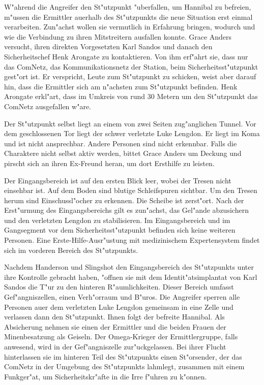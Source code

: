 
W"ahrend die Angreifer den St"utzpunkt "uberfallen, um Hannibal zu befreien, m"ussen die Ermittler au\3erhalb des St"utzpunkts die neue Situation erst einmal verarbeiten. Zun"achst wollen sie vermutlich in Erfahrung bringen, wodurch und wie die Verbindung zu ihren Mitstreitern ausfallen konnte. Grace Anders versucht, ihren direkten Vorgesetzten Karl Sandos und danach den Sicherheitschef Henk Arongate zu kontaktieren. Von ihm erf"ahrt sie, dass nur das ComNetz, das Kommunikationsnetz der Station, beim Sicherheitsst"utzpunkt gest"ort ist. Er verspricht, Leute zum St"utzpunkt zu schicken, weist aber darauf hin, dass die Ermittler sich am n"achsten zum St"utzpunkt befinden. Henk Arongate erkl"art, dass im Umkreis von rund 30 Metern um den St"utzpunkt das ComNetz ausgefallen w"are.

Der St"utzpunkt selbst liegt an einem von zwei Seiten zug"anglichen Tunnel. Vor dem geschlossenen Tor liegt der schwer verletzte Luke Lengdon. Er liegt im Koma und ist nicht ansprechbar. Andere Personen sind nicht erkennbar. Falls die Charaktere nicht selbst aktiv werden, bittet Grace Anders um Deckung und pirscht sich an ihren Ex-Freund heran, um dort Ersthilfe zu leisten.

Der Eingangsbereich ist auf den ersten Blick leer, wobei der Tresen nicht einsehbar ist. Auf dem Boden sind blutige Schleifspuren sichtbar. Um den Tresen herum sind Einschussl"ocher zu erkennen. Die Scheibe ist zerst"ort. Nach der Erst"urmung des Eingangsbereichs gilt es zun"achst, das Gel"ande abzusichern und den verletzten Lengdon zu stabilisieren. Im Eingangsbereich und im Gangsegment vor dem Sicherheitsst"utzpunkt befinden sich keine weiteren Personen. Eine Erste-Hilfe-Ausr"ustung mit medizinischem Expertensystem findet sich im vorderen Bereich des St"utzpunkts.


Nachdem Handerson und Slingshot den Eingangsbereich des St"utzpunkts unter ihre Kontrolle gebracht haben, "offnen sie mit dem Identit"atsimplantat von Karl Sandos die T"ur zu den hinteren R"aumlichkeiten. Dieser Bereich umfasst Gef"angniszellen, einen Verh"orraum und B"uros. Die Angreifer sperren alle Personen au\3er dem verletzten Luke Lengdon gemeinsam in eine Zelle und verlassen dann den St"utzpunkt. Ihnen folgt der befreite Hannibal. Als Absicherung nehmen sie einen der Ermittler und die beiden Frauen der Minenbesatzung als Geiseln. Der Omega-Krieger der Ermittlergruppe, falls anwesend, wird in der Gef"angniszelle zur"uckgelassen. Bei ihrer Flucht hinterlassen sie im hinteren Teil des St"utzpunkts einen St"orsender, der das ComNetz in der Umgebung des St"utzpunkts lahmlegt, zusammen mit einem Funkger"at, um Sicherheitskr"afte in die Irre f"uhren zu k"onnen.

